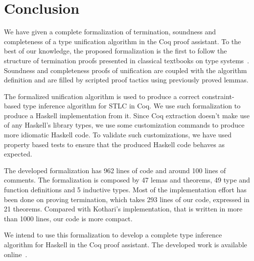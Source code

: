 \section{Conclusion}\label{conclusion}

We have given a complete formalization of termination, soundness and
completeness of a type unification algorithm in the Coq proof
assistant. To the best of our knowledge, the proposed formalization is
the first to follow the structure of termination proofs presented in
classical textbooks on type systems~.
Soundness and completeness proofs of
unification are coupled with the algorithm definition and are filled
by scripted proof tactics using previously proved lemmas.

The formalized unification algorithm is used to produce a correct
constraint-based type inference algorithm for STLC in Coq. We use such
formalization to produce a Haskell implementation from it.
Since Coq extraction doesn't make use of any Haskell's library types, we use
some customization commands to produce more idiomatic Haskell code. To validate
such customizations, we have used property based tests to ensure that the
produced Haskell code behaves as expected.

The developed formalization has 962 lines of code and around 100 lines of
comments. The formalization is composed by 47 lemas and theorems,
49 type and function definitions and 5 inductive types. Most of the implementation
effort has been done on proving termination, which takes 293 lines of
our code, expressed in 21 theorems.  Compared with Kothari's
implementation, that is written in more than 1000 lines, our code is
more compact.

We intend to use this formalization to develop a complete type
inference algorithm for Haskell in the Coq proof assistant. The
developed work is available online~.
